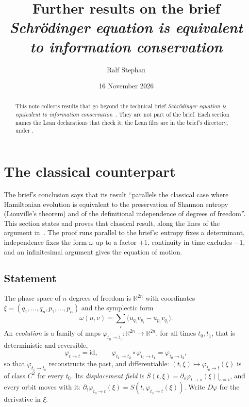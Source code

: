 \documentclass[11pt]{article}
\title{Further results on the brief\\ \emph{Schr\"odinger equation is equivalent to information
  conservation}}
\author{Ralf Stephan}
\date{16 November 2026}
\theoremstyle{definition}
\theoremstyle{remark}
\begin{document}
\maketitle

\begin{abstract}
  This note collects results that go beyond the technical brief \emph{Schr\"odinger equation is
  equivalent to information conservation}~\cite{brief}. They are not part of the brief. Each
  section names the Lean declarations that check it; the Lean files are in the brief's
  directory, under .
\end{abstract}

\section{The classical counterpart}
\label{sec:classical}

The brief's conclusion says that its result ``parallels the classical case where Hamiltonian
evolution is equivalent to the preservation of Shannon entropy (Liouville's theorem) and of the
definitional independence of degrees of freedom''. This section states and proves that classical
result, along the lines of the argument in~\cite[Ch.~\emph{Classical mechanics}, Sec.~\emph{Multiple
degrees of freedom}]{book}. The proof runs parallel to the brief's: entropy fixes a determinant,
independence fixes the form $\omega$ up to a factor $\pm1$, continuity in time excludes $-1$, and
an infinitesimal argument gives the equation of motion.

\subsection{Statement}

The phase space of $n$ degrees of freedom is $\mathbb R^{2n}$ with coordinates
$\xi = (q_1, \dots, q_n, p_1, \dots, p_n)$ and the symplectic form
\[
  \omega(u, v) = \sum_i \bigl(u_{q_i} v_{p_i} - u_{p_i} v_{q_i}\bigr).
\]
An \emph{evolution} is a family of maps $\varphi_{t_0\to t_1}\colon \mathbb R^{2n}\to\mathbb R^{2n}$,
for all times $t_0, t_1$, that is deterministic and reversible,
\[
  \varphi_{t\to t} = \mathrm{id}, \qquad \varphi_{t_1\to t_2}\circ\varphi_{t_0\to t_1} =
  \varphi_{t_0\to t_2},
\]
so that $\varphi_{t_1\to t_0}$ reconstructs the past, and differentiable: $(t, \xi) \mapsto
\varphi_{t_0\to t}(\xi)$ is of class $C^2$ for every $t_0$. Its \emph{displacement field} is
$S(t, \xi) = \partial_s \varphi_{t\to s}(\xi)|_{s=t}$, and every orbit moves with it:
$\partial_t \varphi_{t_0\to t}(\xi) = S(t, \varphi_{t_0\to t}(\xi))$. Write $D\varphi$ for the
derivative in $\xi$.
\end{document}
